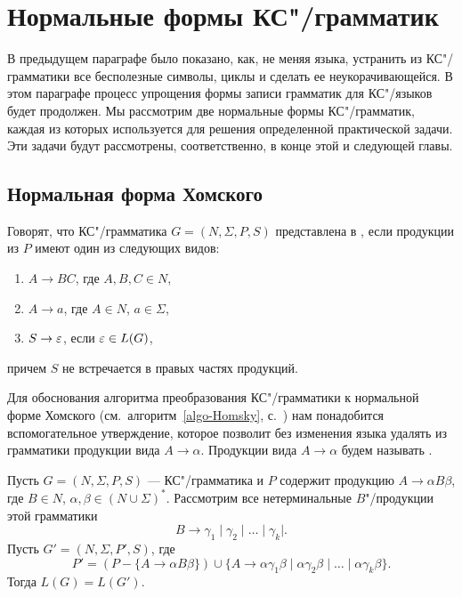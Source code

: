 \chapter{Нормальные формы КС"/грамматик}
\label{normal-cfg}

В предыдущем параграфе было показано, как, не меняя языка, устранить из
КС"/грамматики все бесполезные символы, циклы и сделать ее неукорачивающейся.
В этом параграфе процесс упрощения формы записи грамматик для КС"/языков
будет продолжен. Мы рассмотрим две нормальные формы КС"/грамматик,
каждая из которых используется для решения определенной
практической задачи. Эти задачи будут рассмотрены, соответственно,
в конце этой и следующей главы.


\section{Нормальная форма Хомского}
\label{Chapter7NFH}

Говорят, что КС"/грамматика $G=(N,\Sigma,P,S)$ представлена в
, если продукции из $P$
имеют один из следующих видов:
\begin{enumerate}
    \item $A\to BC$, где $A,B,C\in N$,

    \item $A\to a$, где $A\in N$, $a\in\Sigma$,

    \item $S\to\varepsilon$, если $\varepsilon\in L(G)$,
\end{enumerate}
причем $S$ не встречается в правых частях продукций.

Для обоснования алгоритма преобразования КС"/грамматики к нормальной форме Хом\-ско\-го (см.~алгоритм~\ref{algo-Homsky}, с.~\pageref{algo-Homsky}) нам понадобится вспомогательное утверждение, которое позволит без изменения языка удалять из грамматики продукции вида $A\to\alpha$. Продукции вида $A\to\alpha$ будем называть .

\begin{mylemma}
\label{lemma-proofOfHomskyMod}
Пусть $G=(N,\Sigma,P,S)$ --- КС"/грамматика и $P$ содержит продукцию $A\to\alpha B\beta$, где $B\in N$, $\alpha,\beta\in(N\cup\Sigma)^*$. Рассмотрим все нетерминальные $B$"/про\-дук\-ции этой грамматики
\[
    B \to \gamma_1 \mid \gamma_2 \mid \ldots \mid \gamma_k |.
\]
Пусть $G'=(N,\Sigma,P',S)$, где
\[
    P' = (P - \{A\to\alpha B\beta\}) \cup
        \{A \to \alpha\gamma_1\beta
            \mid \alpha\gamma_2\beta
            \mid \ldots
            \mid \alpha\gamma_k\beta\}.
\]
Тогда $L(G)=L(G')$.
\end{mylemma}

